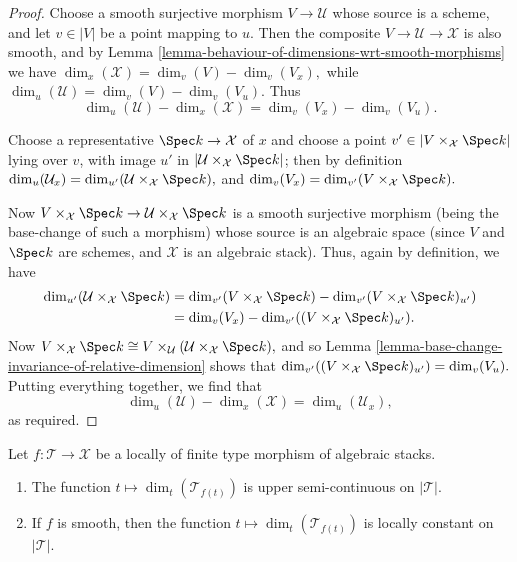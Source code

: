 \begin{proof}
Choose a smooth surjective morphism $V \to \mathcal{U}$ whose source
is a scheme, and let $v\in |V|$ be a point mapping to $u$.
Then the composite $V \to \mathcal{U} \to \mathcal{X}$ is also smooth,
and by Lemma \ref{lemma-behaviour-of-dimensions-wrt-smooth-morphisms}
we have $\dim_x(\mathcal{X}) = \dim_v(V) - \dim_v(V_x),$
while $\dim_u(\mathcal{U}) = \dim_v(V) - \dim_v(V_u).$
Thus
$$
\dim_u(\mathcal{U}) - \dim_x(\mathcal{X}) = \dim_v (V_x) - \dim_v (V_u).
$$

\medskip\noindent
Choose a representative $\Spec k \to \mathcal{X}$ of $x$
and choose a point $v' \in | V \times_{\mathcal{X}} \Spec k|$ lying over
$v$, with image $u'$ in $|\mathcal{U}\times_{\mathcal{X}} \Spec k|$;
then by definition
$\dim_u(\mathcal{U}_x) = \dim_{u'}(\mathcal{U}\times_{\mathcal{X}} \Spec k),$
and
$\dim_v(V_x) = \dim_{v'}(V\times_{\mathcal{X}} \Spec k).$

\medskip\noindent
Now $V\times_{\mathcal{X}} \Spec k \to \mathcal{U}\times_{\mathcal{X}}\Spec k$
is a smooth surjective morphism (being the base-change
of such a morphism) whose source is an algebraic space
(since $V$ and $\Spec k$ are schemes, and $\mathcal{X}$
is an algebraic stack).  Thus, again by definition,
we have
\begin{align*}
\dim_{u'}(\mathcal{U}\times_{\mathcal{X}} \Spec k)
& =
\dim_{v'}(V\times_{\mathcal{X}} \Spec k) -
\dim_{v'}(V \times_{\mathcal{X}} \Spec k)_{u'}) \\
& = \dim_v(V_x) -
\dim_{v'}( (V\times_{\mathcal{X}} \Spec k)_{u'}).
\end{align*}
Now $V\times_{\mathcal{X}} \Spec k \cong
V\times_{\mathcal{U}} (\mathcal{U}\times_{\mathcal{X}} \Spec k),$
and so
Lemma \ref{lemma-base-change-invariance-of-relative-dimension}
shows that
$\dim_{v'}((V\times_{\mathcal{X}} \Spec k)_{u'})  = \dim_v(V_u).$
Putting everything together, we find that
$$
\dim_u(\mathcal{U}) - \dim_x(\mathcal{X}) =
\dim_u(\mathcal{U}_x),
$$
as required.
\end{proof}

\begin{lemma}
\label{lemma-relative-dimension-is-semi-continuous}
Let $f: \mathcal{T} \to \mathcal{X}$ be a locally of finite type morphism of
algebraic stacks.
\begin{enumerate}
\item
The function $t \mapsto \dim_t(\mathcal{T}_{f(t)})$ is upper semi-continuous
on $|\mathcal{T}|$.
\item If $f$ is smooth, then
the function $t \mapsto \dim_t(\mathcal{T}_{f(t)})$ is locally constant
on $|\mathcal{T}|$.
\end{enumerate}
\end{lemma}

